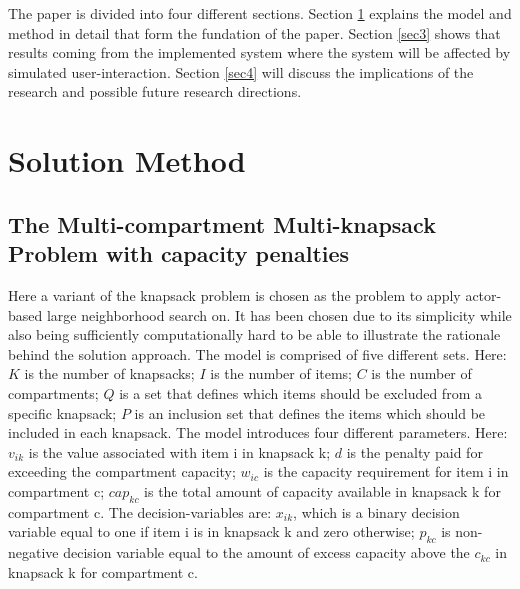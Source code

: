 \documentclass[preprint,12pt,authoryear]{elsarticle}
\begin{document}
The paper is divided into four different sections. Section \ref{sec2} explains the model and method in detail that form the fundation of the paper. 
Section \ref{sec3} shows that results coming from the implemented system where the system will be affected by simulated user-interaction. Section \ref{sec4} 
will discuss the implications of the research and possible future research directions.

\section{Solution Method}
\label{sec2}


\subsection{The Multi-compartment Multi-knapsack Problem with capacity penalties}
\label{sub1sec2}
Here a variant of the knapsack problem is chosen as the problem to apply actor-based large neighborhood search on. It has been chosen due to its simplicity
while also being sufficiently computationally hard to be able to illustrate the rationale behind the solution approach. The model is comprised of 
five different sets. Here: $K$ is the number of knapsacks; $I$ is the number of items; $C$ is the number of compartments; $Q$ is a set that
defines which items should be excluded from a specific knapsack; $P$ is an inclusion set that defines the items which should be included in each 
knapsack. The model introduces four different parameters. Here: $v_{ik}$ is the value associated with item i in knapsack k; $d$ is the 
penalty paid for exceeding the compartment capacity; $w_{ic}$ is the capacity requirement for item i in compartment c; $cap_{kc}$ is the total amount 
of capacity available in knapsack k for compartment c. The decision-variables are: $x_{ik}$, which is a binary decision variable equal to one 
if item i is in knapsack k and zero otherwise; $p_{kc}$ is non-negative decision variable equal to the amount of excess capacity above 
the $c_{kc}$ in knapsack k for compartment c. 
\end{document}
